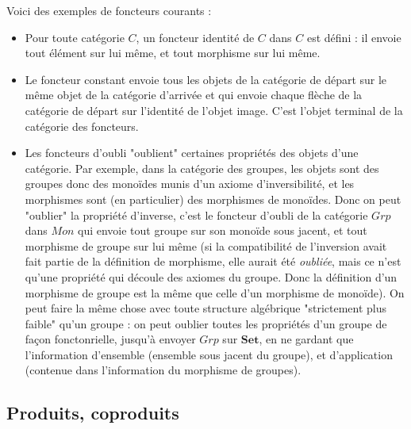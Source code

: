 \documentclass{article}
\begin{document}
Voici des exemples de foncteurs courants : 
\begin{itemize}
    \item Pour toute catégorie $C$, un foncteur identité de $C$ dans $C$ est défini : il envoie tout élément sur lui même, et tout morphisme sur lui même. 
    \item Le foncteur constant  envoie tous les objets de la catégorie de départ sur le même objet de la catégorie d'arrivée et qui envoie chaque flèche de la catégorie de départ sur l'identité de l'objet image. C'est l'objet terminal de la catégorie des foncteurs.
    \item Les foncteurs d'oubli "oublient" certaines propriétés des objets d'une catégorie. Par exemple, dans la catégorie des groupes, les objets sont des groupes donc des monoïdes munis d'un axiome d'inversibilité, et les morphismes sont (en particulier) des morphismes de monoïdes. Donc on peut "oublier" la propriété d'inverse, c'est le foncteur d'oubli de la catégorie $Grp$ dans $Mon$ qui envoie tout groupe sur son monoïde sous jacent, et tout morphisme de groupe sur lui même (si la compatibilité de l'inversion avait fait partie de la définition de morphisme, elle aurait été \textit{oubliée}, mais ce n'est qu'une propriété qui découle des axiomes du groupe. Donc la définition d'un morphisme de groupe est la même que celle d'un morphisme de monoïde). On peut faire la même chose avec toute structure algébrique "strictement plus faible" qu'un groupe : on peut oublier toutes les propriétés d'un groupe de façon fonctonrielle, jusqu'à envoyer $Grp$ sur $\mathbf{Set}$, en ne gardant que l'information d'ensemble (ensemble sous jacent du groupe), et d'application (contenue dans l'information du morphisme de groupes). 
\end{itemize}

\subsection{Produits, coproduits}
\end{document}
